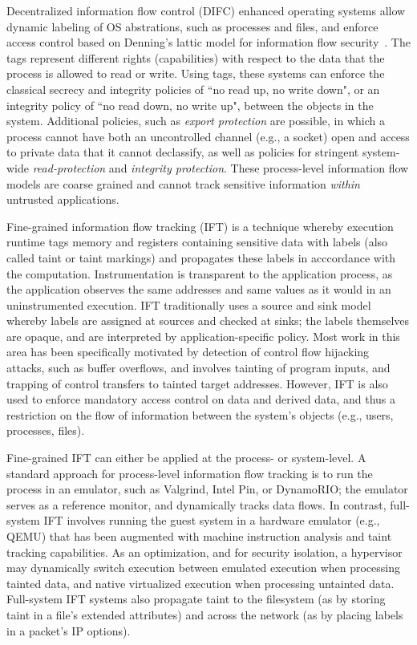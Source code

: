 %
Decentralized information flow control (DIFC) enhanced operating systems allow
dynamic labeling of OS abstrations, such as processes and files, and enforce
access control based on Denning's lattic model for information flow
security~\cite{}.
%
The tags represent different rights (capabilities) with respect to the data
that the process is allowed to read or write.
%
Using tags, these systems can enforce the classical secrecy and integrity policies of
``no read up, no write down", or an integrity policy of ``no read down, no
write up", between the objects in the system.
%
Additional policies, such as \emph{export protection} are possible, in which a
process cannot have both an uncontrolled channel (e.g., a socket) open and
access to private data that it cannot declassify, as well as
policies for stringent system-wide \emph{read-protection} and \emph{integrity
protection}.
%
These process-level information flow models are coarse grained and cannot track
sensitive information \emph{within} untrusted applications.


%
Fine-grained information flow tracking (IFT) is a technique whereby execution
runtime tags memory and registers containing sensitive data with labels (also
called taint or taint markings) and propagates these labels in
acccordance with the computation.
%
Instrumentation is transparent to the application process, as the application
observes the same addresses and same values as it would in an uninstrumented
execution.
%
IFT traditionally uses a source and sink model whereby labels are
assigned at sources and checked at sinks; the labels themselves are opaque,
and are interpreted by application-specific policy.
%
Most work in this area has been specifically motivated by detection of control
flow hijacking attacks, such as buffer overflows, and involves tainting of
program inputs, and trapping of control transfers to tainted target addresses.
%
However, IFT is also used to enforce mandatory access control on data and
derived data, and thus a restriction on the flow of information between
the system's objects (e.g., users, processes, files).


Fine-grained IFT can either be applied at the process- or system-level.
%
A standard approach for process-level information flow tracking is to run
the process in an emulator, such as Valgrind, Intel Pin, or DynamoRIO; the
emulator serves as a reference monitor, and dynamically tracks data flows.
%
In contrast, full-system IFT involves running the guest system in a hardware
emulator (e.g., QEMU) that has been augmented with machine instruction analysis
and taint tracking capabilities.
%
As an optimization, and for security isolation, a hypervisor may dynamically
switch execution between emulated execution when processing tainted data, and
native virtualized execution when processing untainted data.
%
Full-system IFT systems also propagate taint to the filesystem (as by storing
taint in a file's extended attributes) and across the network (as by placing
labels in a packet's IP options).


